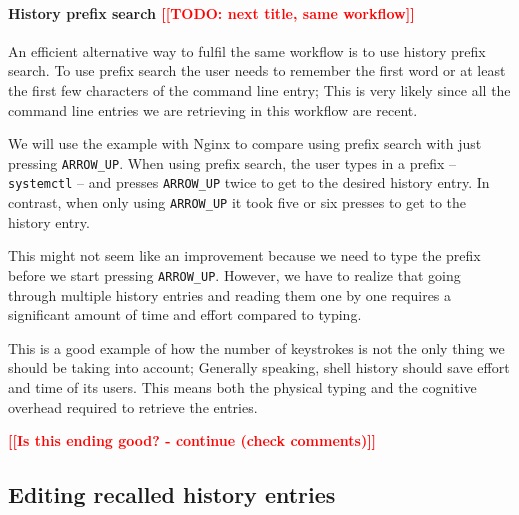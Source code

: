 \documentclass[thesis=M,english]{FITthesis}[2012/10/20]
\newcommand{\todotext}[1]{\textcolor{red}{\textbf{[[#1]]}}}
\newcommand{\redtext}[1]{\textcolor{red}{[[#1]]}}
\begin{document}
\paragraph{History prefix search \redtext{TODO: next title, same workflow}}

An efficient alternative way to fulfil the same workflow is to use history prefix search. To use prefix search the user needs to remember the first word or at least the first few characters of the command line entry; This is very likely since all the command line entries we are retrieving in this workflow are recent.

We will use the example with Nginx to compare using prefix search with just pressing \verb|ARROW_UP|. When using prefix search, the user types in a prefix -- \verb|systemctl| -- and presses \verb|ARROW_UP| twice to get to the desired history entry. In contrast, when only using \verb|ARROW_UP| it took five or six presses to get to the history entry.

This might not seem like an improvement because we need to type the prefix before we start pressing \verb|ARROW_UP|. However, we have to realize that going through multiple history entries and reading them one by one requires a significant amount of time and effort compared to typing. 
    
This is a good example of how the number of keystrokes is not the only thing we should be taking into account; Generally speaking, shell history should save effort and time of its users. This means both the physical typing and the cognitive overhead required to retrieve the entries.


\todotext{Is this ending good? - continue (check comments)}



\subsection{Editing recalled history entries}
\end{document}
